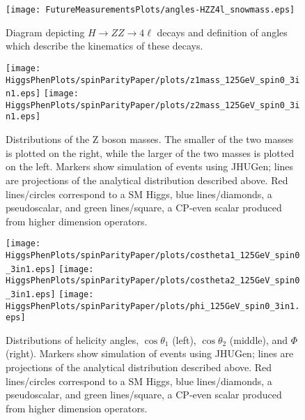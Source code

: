 \begin{figure}
\begin{center}
\texttt{[image: FutureMeasurementsPlots/angles-HZZ4l\_snowmass.eps]}
\caption{Diagram depicting $H\to ZZ\to4\ell$ decays and definition
of angles which describe the kinematics of these decays.}
\label{fig:HZZdiagram}
\end{center}
\end{figure}

\begin{figure}
\begin{center}
\texttt{[image: HiggsPhenPlots/spinParityPaper/plots/z1mass\_125GeV\_spin0\_3in1.eps]}
\texttt{[image: HiggsPhenPlots/spinParityPaper/plots/z2mass\_125GeV\_spin0\_3in1.eps]}
\caption{Distributions of the Z boson masses.  The smaller of the two masses is
plotted on the right, while the larger of the two masses is plotted on the
left. Markers show simulation of events using JHUGen; lines are projections
of the analytical distribution described above.  Red lines/circles correspond
to a SM Higgs, blue lines/diamonds, a pseudoscalar, and green lines/square, 
a CP-even scalar produced from higher dimension operators.}
\label{fig:ScalarMasses}
\end{center}
\end{figure}

\begin{figure}
\begin{center}
\texttt{[image: HiggsPhenPlots/spinParityPaper/plots/costheta1\_125GeV\_spin0\_3in1.eps]}
\texttt{[image: HiggsPhenPlots/spinParityPaper/plots/costheta2\_125GeV\_spin0\_3in1.eps]}
\texttt{[image: HiggsPhenPlots/spinParityPaper/plots/phi\_125GeV\_spin0\_3in1.eps]}
\caption{Distributions of helicity angles, $\cos\theta_1$ (left), 
$\cos\theta_2$ (middle), and $\Phi$ (right). Markers show simulation of 
events using JHUGen; lines are projections
of the analytical distribution described above.  Red lines/circles correspond
to a SM Higgs, blue lines/diamonds, a pseudoscalar, and green lines/square, 
a CP-even scalar produced from higher dimension operators.}
\label{fig:ScalarHelicityAngles}
\end{center}
\end{figure}

